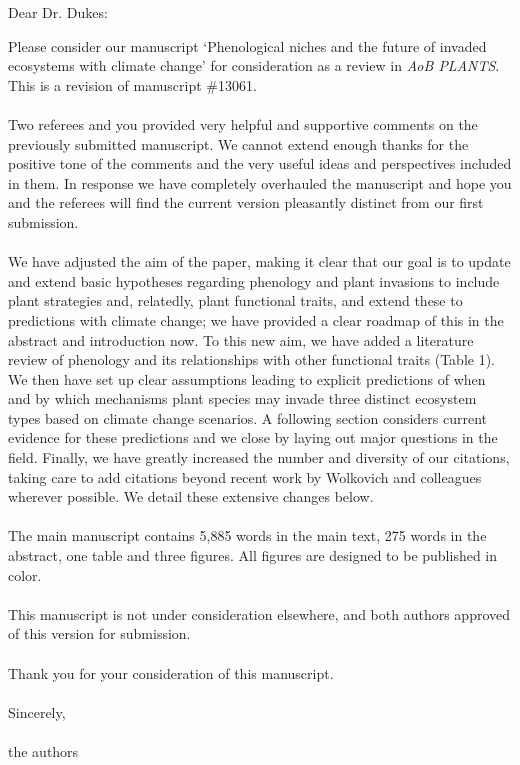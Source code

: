 \documentclass[11pt,a4paper]{letter}
\begin{document}
\thispagestyle{empty}
\begin{letter}{}
\renewcommand{\refname}{\CHead{Literature Cited}}


\opening{Dear Dr. Dukes:}

Please consider our manuscript `Phenological niches and the future of invaded ecosystems with climate change' for consideration as a review in \emph{AoB PLANTS}. This is a revision of manuscript \#13061.\\
\\
Two referees and you provided very helpful and supportive comments on the previously submitted manuscript. We cannot extend enough thanks for the positive tone of the comments and the very useful ideas and perspectives included in them. In response we have completely overhauled the manuscript and hope you and the referees will find the current version pleasantly distinct from our first submission. \\
\\
We have adjusted the aim of the paper, making it clear that our goal is to update and extend basic hypotheses regarding phenology and plant invasions to include plant strategies and, relatedly, plant functional traits, and extend these to predictions with climate change; we have provided a clear roadmap of this in the abstract and introduction now. To this new aim, we have added a literature review of phenology and its relationships with other functional traits (Table 1). We then have set up clear assumptions leading to explicit predictions of when and by which mechanisms plant species may invade three distinct ecosystem types based on climate change scenarios. A following section considers current evidence for these predictions and we close by laying out major questions in the field. Finally, we have greatly increased the number and diversity of our citations, taking care to add citations beyond recent work by Wolkovich and colleagues wherever possible. We detail these extensive changes below.\\
\\
The main manuscript contains 5,885 words in the main text, 275 words in the abstract, one table and three figures. All figures are designed to be published in color. \\
\\
This manuscript is not under consideration elsewhere, and both authors approved of this version for submission.\\
\\
Thank you for your consideration of this manuscript.\\
\\
Sincerely,
\\
\\
\noindent the authors


\end{letter}
\end{document}
